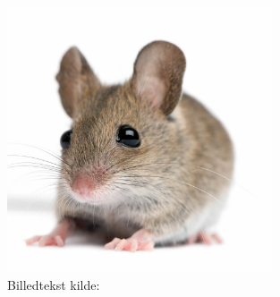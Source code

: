 \documentclass{article}
\begin{document}
\begin{figure}[H] 
\begin{center}
\includegraphics[width=0.7\textwidth]{figures/mus} %
\end{center}
\caption{Billedtekst kilde: \cite{mus}} %
\label{fig:mus} %
\end{figure}

\end{document}
